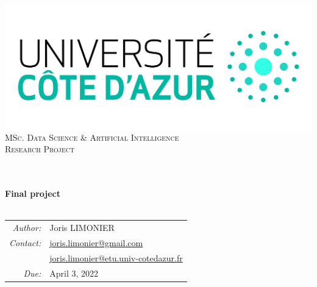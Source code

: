 \begin{titlepage}
	\begin{center}
		\includegraphics[width=\textwidth]{images/logo_uca.jpeg}\\[0.1cm]
		\vspace{1.5cm}
		\textsc{\Large MSc. Data Science \& Artificial Intelligence}\\[1.2cm]
		\textsc{\Large Research Project}\\[1.2cm]
		\\
		\vspace{1cm}

		\HRule \\[0.6cm]
		{\huge \bfseries Final project}\\[0.3cm]
		\HRule \\[1.8cm]
		\vfill

		\large
			\begin{tabular}{ r l }
				\emph{Author:} & Joris LIMONIER\\[.2cm]
				\emph{Contact:} & \href{mailto:joris.limonier@gmail.com}{\color{black}joris.limonier@gmail.com} \\[.2cm]
				 & \href{mailto:joris.limonier@etu.univ-cotedazur.fr}{\color{black}joris.limonier@etu.univ-cotedazur.fr} \\[.2cm]
				\emph{Due:} & {\large April 3, 2022}
			\end{tabular}
	\end{center}
\end{titlepage}


